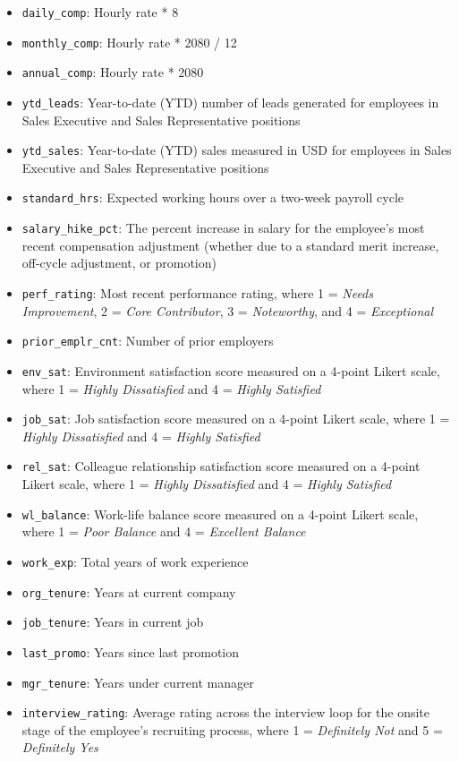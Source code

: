 \documentclass[
]{book}
\begin{document}
\begin{itemize}
\item
  \texttt{daily\_comp}: Hourly rate * 8
\item
  \texttt{monthly\_comp}: Hourly rate * 2080 / 12
\item
  \texttt{annual\_comp}: Hourly rate * 2080
\item
  \texttt{ytd\_leads}: Year-to-date (YTD) number of leads generated for employees in Sales Executive and Sales Representative positions
\item
  \texttt{ytd\_sales}: Year-to-date (YTD) sales measured in USD for employees in Sales Executive and Sales Representative positions
\item
  \texttt{standard\_hrs}: Expected working hours over a two-week payroll cycle
\item
  \texttt{salary\_hike\_pct}: The percent increase in salary for the employee's most recent compensation adjustment (whether due to a standard merit increase, off-cycle adjustment, or promotion)
\item
  \texttt{perf\_rating}: Most recent performance rating, where 1 = \emph{Needs Improvement}, 2 = \emph{Core Contributor}, 3 = \emph{Noteworthy}, and 4 = \emph{Exceptional}
\item
  \texttt{prior\_emplr\_cnt}: Number of prior employers
\item
  \texttt{env\_sat}: Environment satisfaction score measured on a 4-point Likert scale, where 1 = \emph{Highly Dissatisfied} and 4 = \emph{Highly Satisfied}
\item
  \texttt{job\_sat}: Job satisfaction score measured on a 4-point Likert scale, where 1 = \emph{Highly Dissatisfied} and 4 = \emph{Highly Satisfied}
\item
  \texttt{rel\_sat}: Colleague relationship satisfaction score measured on a 4-point Likert scale, where 1 = \emph{Highly Dissatisfied} and 4 = \emph{Highly Satisfied}
\item
  \texttt{wl\_balance}: Work-life balance score measured on a 4-point Likert scale, where 1 = \emph{Poor Balance} and 4 = \emph{Excellent Balance}
\item
  \texttt{work\_exp}: Total years of work experience
\item
  \texttt{org\_tenure}: Years at current company
\item
  \texttt{job\_tenure}: Years in current job
\item
  \texttt{last\_promo}: Years since last promotion
\item
  \texttt{mgr\_tenure}: Years under current manager
\item
  \texttt{interview\_rating}: Average rating across the interview loop for the onsite stage of the employee's recruiting process, where 1 = \emph{Definitely Not} and 5 = \emph{Definitely Yes}
\end{itemize}
\end{document}
